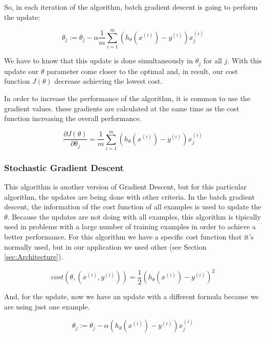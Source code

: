 \documentclass[12pt]{article}
\begin{document}
So, in each iteration of the algorithm, batch gradient descent is going to perform the update:

 \begin{equation}
 \theta_{j}:= \theta_{j} - \alpha \frac{1}{m} \displaystyle\sum_{i=1}^{m} (h_{\theta}(x^{(i)})-y^{(i)})x_{j}^{(i)}
\end{equation}

We have to know that this update is done simultaneously in $\theta_{j}$ for all $j$. With this update our $\theta$ parameter come closer to the optimal and, in result, our cost function $J(\theta)$ decrease achieving the lowest cost.

In order to increase the performance of the algorithm, it is common to use the gradient values. these gradients are calculated at the same time as the cost function increasing the overall performance.

\begin{equation}
 \frac{\partial J(\theta)}{\partial\theta_{j}}= \frac{1}{m} \displaystyle\sum_{i=1}^{m} (h_{\theta}(x^{(i)})-y^{(i)})x_{j}^{(i)}
\end{equation}

\subsubsection{Stochastic Gradient Descent}
\label{sec:SGradient}
This algorithm is another version of Gradient Descent, but for this particular algorithm, the updates are being done with other criteria. In the batch gradient descent, the information of the cost function of all examples is used to update the $\theta$. Because the updates are not doing with all examples, this algorithm is tipically used in problems with a large number of training examples in order to achieve a better performance. For this algorithm we have a specific cost function that it's normally used, but in our application we used other (see Section \ref{sec:Architecture}).

\begin{equation}
 cost(\theta,(x^{(i)},y^{(i)}))= \frac{1}{2}(h_{\theta}(x^{(i)})-y^{(i)})^2
\end{equation}

And, for the update, now we have an update with a different formula because we are using just one example.

 \begin{equation}
 \theta_{j}:= \theta_{j} - \alpha (h_{\theta}(x^{(i)})-y^{(i)})x_{j}^{(i)}
\end{equation}
\end{document}
